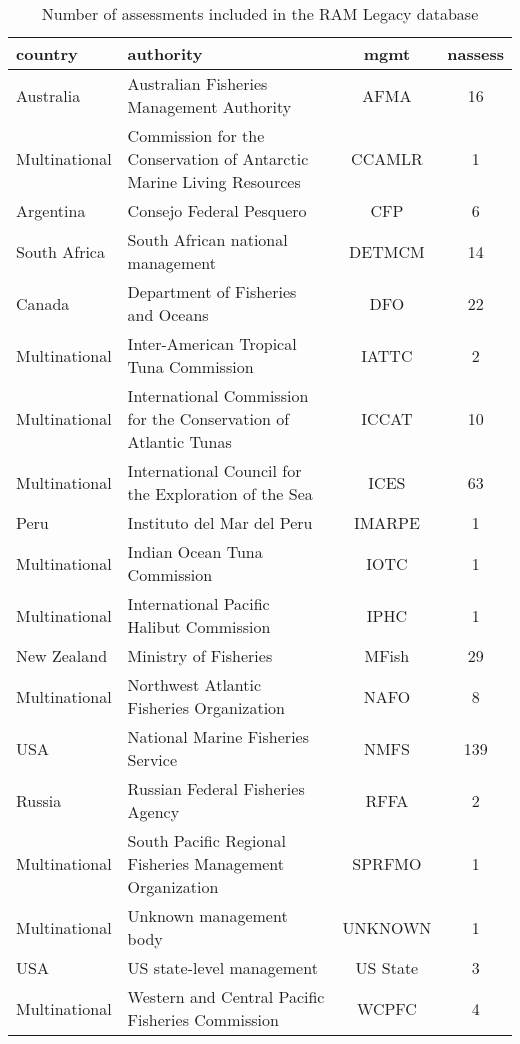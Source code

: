 \begin{table}[ht]
\begin{center}
\caption{Number of assessments included in the RAM Legacy database}
\label{tab:mgmt}
\begin{tabular}{p{3cm}p{5cm}cc}
  \hline
country & authority & mgmt & nassess \\ 
  \hline
Australia & Australian Fisheries Management Authority & AFMA &  16 \\ 
  Multinational & Commission for the Conservation of Antarctic Marine Living Resources & CCAMLR &   1 \\ 
  Argentina & Consejo Federal Pesquero & CFP &   6 \\ 
  South Africa & South African national management & DETMCM &  14 \\ 
  Canada & Department of Fisheries and Oceans & DFO &  22 \\ 
  Multinational & Inter-American Tropical Tuna Commission & IATTC &   2 \\ 
  Multinational & International Commission for the Conservation of Atlantic Tunas & ICCAT &  10 \\ 
  Multinational & International Council for the Exploration of the Sea & ICES &  63 \\ 
  Peru & Instituto del Mar del Peru & IMARPE &   1 \\ 
  Multinational & Indian Ocean Tuna Commission & IOTC &   1 \\ 
  Multinational & International Pacific Halibut Commission & IPHC &   1 \\ 
  New Zealand & Ministry of Fisheries & MFish &  29 \\ 
  Multinational & Northwest Atlantic Fisheries Organization & NAFO &   8 \\ 
  USA & National Marine Fisheries Service & NMFS & 139 \\ 
  Russia & Russian Federal Fisheries Agency & RFFA &   2 \\ 
  Multinational & South Pacific Regional Fisheries Management Organization & SPRFMO &   1 \\ 
  Multinational & Unknown management body & UNKNOWN &   1 \\ 
  USA & US state-level management & US State &   3 \\ 
  Multinational & Western and Central Pacific Fisheries Commission & WCPFC &   4 \\ 
   \hline
\end{tabular}
\end{center}
\end{table}
